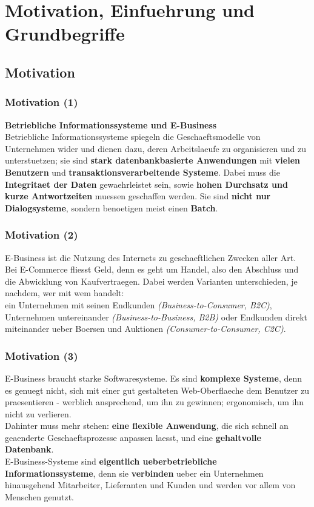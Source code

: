 \documentclass[a4paper,10pt]{article}
\begin{document}
\section{Motivation, Einfuehrung und Grundbegriffe}

\subsection{Motivation}
\subsubsection{Motivation (1)}
\textbf{Betriebliche Informationssysteme und E-Business}\\
Betriebliche Informationssysteme spiegeln die Geschaeftsmodelle von Unternehmen wider und dienen dazu, deren Arbeitslaeufe zu organisieren und zu unterstuetzen; sie sind \textbf{stark datenbankbasierte Anwendungen} mit \textbf{vielen Benutzern} und \textbf{transaktionsverarbeitende Systeme}. Dabei muss die \textbf{Integritaet der Daten} gewaehrleistet sein, sowie \textbf{hohen Durchsatz und kurze Antwortzeiten} muessen geschaffen werden. Sie sind \textbf{nicht nur Dialogsysteme}, sondern benoetigen meist einen \textbf{Batch}.

\subsubsection{Motivation (2)}
E-Business ist die Nutzung des Internets zu geschaeftlichen Zwecken aller Art. Bei E-Commerce fliesst Geld, denn es geht um Handel, also den Abschluss und die Abwicklung von Kaufvertraegen. Dabei werden Varianten unterschieden, je nachdem, wer mit wem handelt:\\
ein Unternehmen mit seinen Endkunden \emph{(Business-to-Consumer, B2C)}, Unternehmen untereinander \emph{(Business-to-Business, B2B)} oder Endkunden direkt miteinander ueber Boersen und Auktionen \emph{(Consumer-to-Consumer, C2C)}.

\subsubsection{Motivation (3)}
E-Business braucht starke Softwaresysteme. Es sind \textbf{komplexe Systeme}, denn es genuegt nicht, sich mit einer gut gestalteten Web-Oberflaeche dem Benutzer zu praesentieren - werblich ansprechend, um ihn zu gewinnen; ergonomisch, um ihn nicht zu verlieren.\\
Dahinter muss mehr stehen: \textbf{eine flexible Anwendung}, die sich schnell an geaenderte Geschaeftsprozesse anpassen laesst, und eine \textbf{gehaltvolle Datenbank}.\\
E-Business-Systeme sind \textbf{eigentlich ueberbetriebliche Informationssysteme}, denn sie \textbf{verbinden} ueber ein Unternehmen hinausgehend Mitarbeiter, Lieferanten und Kunden und werden vor allem von Menschen genutzt.
\end{document}
